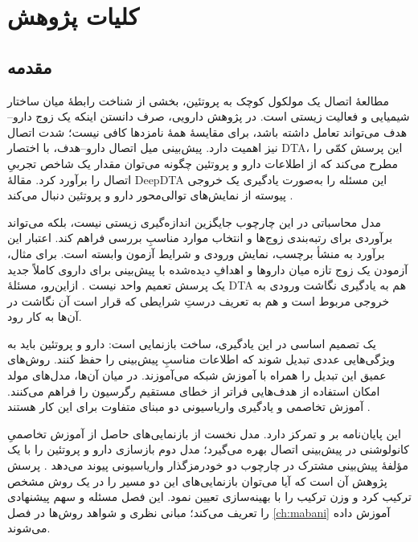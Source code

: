 \chapter{کلیات پژوهش}
\label{ch:kolliyat}

\section{مقدمه}
\label{sec:moghaddame}
مطالعهٔ اتصال یک مولکول کوچک به پروتئین، بخشی از شناخت رابطهٔ میان ساختار شیمیایی و فعالیت زیستی است. در پژوهش دارویی، صرف دانستن اینکه یک زوج دارو--هدف می‌تواند تعامل داشته باشد، برای مقایسهٔ همهٔ نامزدها کافی نیست؛ شدت اتصال نیز اهمیت دارد. پیش‌بینی میل اتصال دارو--هدف، با اختصار DTA، این پرسش کمّی را مطرح می‌کند که از اطلاعات دارو و پروتئین چگونه می‌توان مقدار یک شاخص تجربیِ اتصال را برآورد کرد. مقالهٔ DeepDTA این مسئله را به‌صورت یادگیری یک خروجی پیوسته از نمایش‌های توالی‌محور دارو و پروتئین دنبال می‌کند \cite{Ozturk18DeepDTA}.

مدل محاسباتی در این چارچوب جایگزین اندازه‌گیری زیستی نیست، بلکه می‌تواند برآوردی برای رتبه‌بندی زوج‌ها و انتخاب موارد مناسبِ بررسی فراهم کند. اعتبار این برآورد به منشأ برچسب، نمایش ورودی و شرایط آزمون وابسته است. برای مثال، آزمودن یک زوج تازه میان داروها و اهدافِ دیده‌شده با پیش‌بینی برای داروی کاملاً جدید یک پرسش تعمیم واحد نیست \cite{Pahikkala15RealisticDTA}. ازاین‌رو، مسئلهٔ DTA هم به یادگیری نگاشت ورودی به خروجی مربوط است و هم به تعریف درستِ شرایطی که قرار است آن نگاشت در آن‌ها به کار رود.

یک تصمیم اساسی در این یادگیری، ساخت بازنمایی است: دارو و پروتئین باید به ویژگی‌هایی عددی تبدیل شوند که اطلاعات مناسبِ پیش‌بینی را حفظ کنند. روش‌های عمیق این تبدیل را همراه با آموزش شبکه می‌آموزند. در میان آن‌ها، مدل‌های مولد امکان استفاده از هدف‌هایی فراتر از خطای مستقیم رگرسیون را فراهم می‌کنند. آموزش تخاصمی و یادگیری واریاسیونی دو مبنای متفاوت برای این کار هستند \cite{Goodfellow14GAN,Kingma14VAE}.

این پایان‌نامه بر  و  تمرکز دارد. مدل نخست از بازنمایی‌های حاصل از آموزش تخاصمیِ کانولوشنی در پیش‌بینی اتصال بهره می‌گیرد؛ مدل دوم بازسازی دارو و پروتئین را با یک مؤلفهٔ پیش‌بینی مشترک در چارچوب دو خودرمزگذار واریاسیونی پیوند می‌دهد \cite{Kalemati24DCGANDTA,Li22CoVAE}. پرسش پژوهش آن است که آیا می‌توان بازنمایی‌های این دو مسیر را در یک روش مشخص ترکیب کرد و وزن ترکیب را با بهینه‌سازی تعیین نمود. این فصل مسئله و سهم پیشنهادی را تعریف می‌کند؛ مبانی نظری و شواهد روش‌ها در فصل \ref{ch:mabani} آموزش داده می‌شوند.

